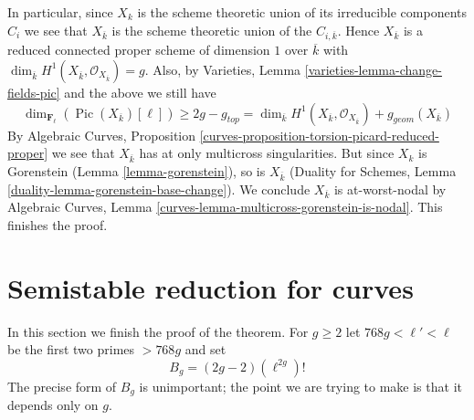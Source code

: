 \documentclass{stacks-project}
\theoremstyle{plain}
\theoremstyle{definition}
\theoremstyle{remark}
\numberwithin{equation}{subsection}
\def\Pic{\mathop{\mathrm{Pic}}\nolimits}
\begin{document}
\medskip\noindent
In particular, since $X_k$ is the scheme theoretic union of its
irreducible components $C_i$ we see that $X_{\overline{k}}$ is the
scheme theoretic union of the $C_{i, \overline{k}}$.
Hence $X_{\overline{k}}$ is a reduced connected proper
scheme of dimension $1$ over $\overline{k}$ with $\dim_{\overline{k}}
H^1(X_{\overline{k}}, \mathcal{O}_{X_{\overline{k}}}) = g$.
Also, by Varieties, Lemma \ref{varieties-lemma-change-fields-pic}
and the above we still have
$$
\dim_{\mathbf{F}_\ell}(\Pic(X_{\overline{k}})[\ell])
\geq 2g - g_{top} =
\dim_{\overline{k}} H^1(X_{\overline{k}}, \mathcal{O}_{X_{\overline{k}}})
+ g_{geom}(X_{\overline{k}})
$$
By Algebraic Curves, Proposition
\ref{curves-proposition-torsion-picard-reduced-proper}
we see that $X_{\overline{k}}$ has at only multicross singularities.
But since $X_k$ is Gorenstein (Lemma \ref{lemma-gorenstein}),
so is $X_{\overline{k}}$ (Duality for Schemes, Lemma
\ref{duality-lemma-gorenstein-base-change}).
We conclude $X_{\overline{k}}$ is at-worst-nodal by
Algebraic Curves, Lemma \ref{curves-lemma-multicross-gorenstein-is-nodal}.
This finishes the proof.










\section{Semistable reduction for curves}
\label{section-semistable-reduction-theorem}

\noindent
In this section we finish the proof of the theorem.
For $g \geq 2$ let $768g < \ell' < \ell$
be the first two primes $> 768g$ and set
\begin{equation}
\label{equation-bound}
B_g = (2g - 2)(\ell^{2g})!
\end{equation}
The precise form of $B_g$ is unimportant; the point we are trying
to make is that it depends only on $g$.
\end{document}

